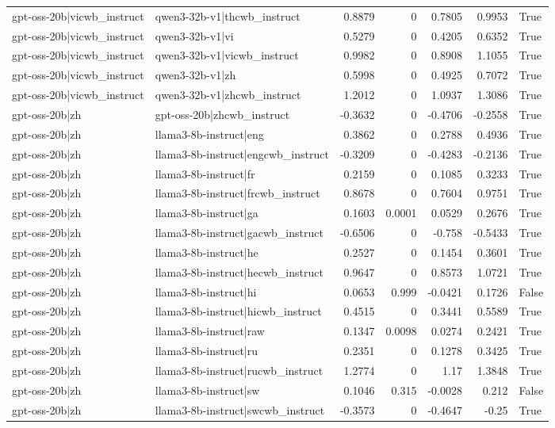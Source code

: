 \begin{table}
\begin{tabular}{l l r r r r l}
gpt-oss-20b|vicwb_instruct & qwen3-32b-v1|thcwb_instruct & 0.8879 & 0 & 0.7805 & 0.9953 & True \\
gpt-oss-20b|vicwb_instruct & qwen3-32b-v1|vi & 0.5279 & 0 & 0.4205 & 0.6352 & True \\
gpt-oss-20b|vicwb_instruct & qwen3-32b-v1|vicwb_instruct & 0.9982 & 0 & 0.8908 & 1.1055 & True \\
gpt-oss-20b|vicwb_instruct & qwen3-32b-v1|zh & 0.5998 & 0 & 0.4925 & 0.7072 & True \\
gpt-oss-20b|vicwb_instruct & qwen3-32b-v1|zhcwb_instruct & 1.2012 & 0 & 1.0937 & 1.3086 & True \\
gpt-oss-20b|zh & gpt-oss-20b|zhcwb_instruct & -0.3632 & 0 & -0.4706 & -0.2558 & True \\
gpt-oss-20b|zh & llama3-8b-instruct|eng & 0.3862 & 0 & 0.2788 & 0.4936 & True \\
gpt-oss-20b|zh & llama3-8b-instruct|engcwb_instruct & -0.3209 & 0 & -0.4283 & -0.2136 & True \\
gpt-oss-20b|zh & llama3-8b-instruct|fr & 0.2159 & 0 & 0.1085 & 0.3233 & True \\
gpt-oss-20b|zh & llama3-8b-instruct|frcwb_instruct & 0.8678 & 0 & 0.7604 & 0.9751 & True \\
gpt-oss-20b|zh & llama3-8b-instruct|ga & 0.1603 & 0.0001 & 0.0529 & 0.2676 & True \\
gpt-oss-20b|zh & llama3-8b-instruct|gacwb_instruct & -0.6506 & 0 & -0.758 & -0.5433 & True \\
gpt-oss-20b|zh & llama3-8b-instruct|he & 0.2527 & 0 & 0.1454 & 0.3601 & True \\
gpt-oss-20b|zh & llama3-8b-instruct|hecwb_instruct & 0.9647 & 0 & 0.8573 & 1.0721 & True \\
gpt-oss-20b|zh & llama3-8b-instruct|hi & 0.0653 & 0.999 & -0.0421 & 0.1726 & False \\
gpt-oss-20b|zh & llama3-8b-instruct|hicwb_instruct & 0.4515 & 0 & 0.3441 & 0.5589 & True \\
gpt-oss-20b|zh & llama3-8b-instruct|raw & 0.1347 & 0.0098 & 0.0274 & 0.2421 & True \\
gpt-oss-20b|zh & llama3-8b-instruct|ru & 0.2351 & 0 & 0.1278 & 0.3425 & True \\
gpt-oss-20b|zh & llama3-8b-instruct|rucwb_instruct & 1.2774 & 0 & 1.17 & 1.3848 & True \\
gpt-oss-20b|zh & llama3-8b-instruct|sw & 0.1046 & 0.315 & -0.0028 & 0.212 & False \\
gpt-oss-20b|zh & llama3-8b-instruct|swcwb_instruct & -0.3573 & 0 & -0.4647 & -0.25 & True \\

\end{tabular}
\end{table}
